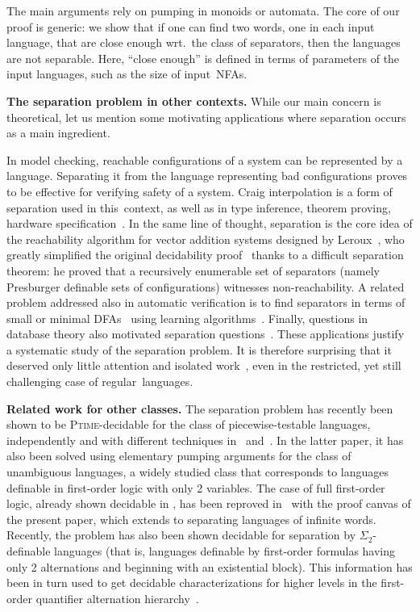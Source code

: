 \documentclass{LMCS}
\newcommand\mypar[1]{\par\medskip\noindent\textbf{#1}}
\theoremstyle{plain}
\begin{document}
\smallskip
The main arguments rely on pumping in monoids or automata.  The core
of our proof is generic: we show that if one can find
two words, one in each input language, that are close enough wrt.\ the
class of separators, then the languages  are not separable. 
Here, ``close enough'' is defined in terms of parameters of the input
languages, such as the size of input~NFAs.

\mypar{The separation problem in other contexts.}  While our main concern is
theoretical, let us mention some motivating applications where separation
occurs as a main ingredient.  

In model checking, reachable configurations of a system can be represented by
a language. Separating it from the language representing bad configurations
proves to be effective for verifying safety of a system. Craig interpolation
is a form of separation used in this~context, as well as in type inference,
theorem proving, hardware
specification~\cite{McMillan:Applications-Craig-Interpolants-Model:2005:a,Henzinger&Jhala&Majumdar&McMillan:Abstractions-from-proofs:2004:a}.
In the same line of thought, separation is the core idea of the reachability
algorithm for vector addition systems designed by
Leroux~\cite{LEROUX-TURING100}, who greatly simplified the original
decidability proof~\cite{DBLP:journals/siamcomp/Mayr84} thanks to a difficult separation theorem: he proved that a
recursively enumerable set of separators (namely Presburger definable sets of
configurations) witnesses non-reachability. A related problem addressed also
in automatic verification is to find separators in terms of small or minimal
DFAs~\cite{Gupta08:autom} using learning
algorithms~\cite{Chen09:learning,Leucker:2006}.  Finally, questions in
database theory also motivated separation questions~\cite{martens}.  These
applications justify a systematic study of the separation problem.  It is
therefore surprising that it deserved only little attention and isolated
work~\cite{Choffrut2007274,Choffrut200627,szygram,Hunt:1982:DGP:322307.322317},
even in the restricted, yet still challenging case of regular~languages.

\mypar{Related work for other classes.}  The separation problem has recently
been shown to be \textsc{Ptime}-decidable for the class of piecewise-testable
languages, independently and with different techniques in~\cite{martens}
and~\cite{PvRZ:mfcs}. In the latter paper, it has also been solved using
elementary pumping arguments for the class of unambiguous languages, a widely
studied class that corresponds to languages definable in first-order logic
with only 2 variables. The case of full first-order logic, already shown decidable in
\cite{Henckell:1988}, has been reproved in~\cite{PZ:lics14} with the proof
canvas of the present paper, which extends to separating languages of infinite
words. Recently, the problem has also been shown decidable for separation by
$\Sigma_2$-definable languages (that is, languages definable by first-order
formulas having only 2 alternations and beginning with an existential block).
This information has been in turn used to get decidable characterizations for
higher levels in the first-order quantifier alternation
hierarchy~\cite{PZ:icalp14}.
\end{document}
